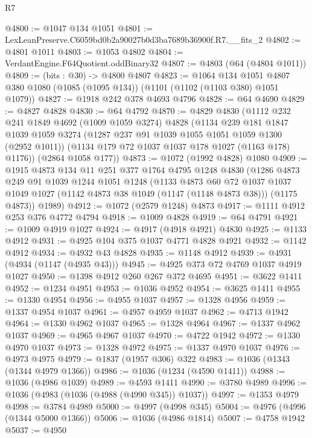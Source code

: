 \begin{lexlean}{R7}
\begin{coremodule}
@4800 := @1047 @134 @1051
@4801 := LexLeanPreserve.C6059bd0b2a90027b0d3ba7689b36900f.R7.__fits_2
@4802 := @4801 @1011
@4803 := @1053 @4802
@4804 := VerdantEngine.F64Quotient.oddBinary32
@4807 := @4803 (@64 (@4804 @1011))
@4809 := (bits : @30) -> @4800 @4807
@4823 := @1064
    @134
    @1051
    @4807
    @380
    @1080
    (@1085 (@1095 @134))
    (@1101 (@1102 (@1103 @380) @1051 @1079))
@4827 := @1918 @242 @378 @4693 @4796
@4828 := @64 @4690
@4829 := @4827 @4828
@4830 := @64 @4792
@4870 := @4829
    @4830
    (@1112
      @232
      @241
      @1849
      @4692
      (@1009 @1059 @3274)
      @4828
      (@1134
        @239
        @181
        @1847
        @1039
        @1059
        @3274
        (@1287 @237 @91 @1039 @1055 @1051 @1059 @1300 (@2952 @1011))
        (@1134 @179 @72 @1037 @1037 @178 @1027 (@1163 @178) @1176))
      (@2864 @1058 @177))
@4873 := @1072 (@1992 @4828) @1080
@4909 := @1915
    @4873
    @134
    @11
    @251
    @377
    @1764
    @4795
    @1248
    @4830
    (@1286
      @4873
      @249
      @91
      @1039
      @1244
      @1051
      @1248
      (@1133
        @4873
        @60
        @72
        @1037
        @1037
        @1049
        @1027
        (@1142 @4873 @38 @1049 (@1147 (@1148 @4873 @38)))
        (@1175 @4873))
      @1989)
@4912 := @1072 (@2579 @1248) @4873
@4917 := @1111 @4912 @253 @376 @4772 @4794
@4918 := @1009 @4828
@4919 := @64 @4791
@4921 := @1009 @4919 @1027
@4924 := @4917 (@4918 @4921) @4830
@4925 := @1133 @4912
@4931 := @4925 @104 @375 @1037 @4771 @4828 @4921
@4932 := @1142 @4912
@4934 := @4932 @43 @4828
@4935 := @1148 @4912
@4939 := @4931 (@4934 (@1147 (@4935 @43)))
@4945 := @4925 @373 @72 @4769 @1037 @4919 @1027
@4950 := @1398 @4912 @260 @267 @372 @4695
@4951 := @3622 @1411
@4952 := @1234 @4951
@4953 := @1036 @4952
@4954 := @3625 @1411
@4955 := @1330 @4954
@4956 := @4955 @1037
@4957 := @1328 @4956
@4959 := @1337 @4954 @1037
@4961 := @4957 @4959 @1037
@4962 := @4713 @1942
@4964 := @1330 @4962 @1037
@4965 := @1328 @4964
@4967 := @1337 @4962 @1037
@4969 := @4965 @4967 @1037
@4970 := @4722 @1942
@4972 := @1330 @4970 @1037
@4973 := @1328 @4972
@4975 := @1337 @4970 @1037
@4976 := @4973 @4975
@4979 := @1837 (@1957 @306) @322
@4983 := @1036 (@1343 (@1344 @4979 @1366))
@4986 := @1036 (@1234 (@4590 @1411))
@4988 := @1036 (@4986 @1039)
@4989 := @4593 @1411
@4990 := @3780 @4989
@4996 := @1036 (@4983 (@1036 (@4988 (@4990 @345)) @1037))
@4997 := @1353 @4979
@4998 := @3784 @4989
@5000 := @4997 (@4998 @345)
@5004 := @4976 (@4996 (@1344 @5000 @1366))
@5006 := @1036 (@4986 @1814)
@5007 := @4758 @1942
@5037 := @4950

\end{coremodule}
\end{lexlean}
